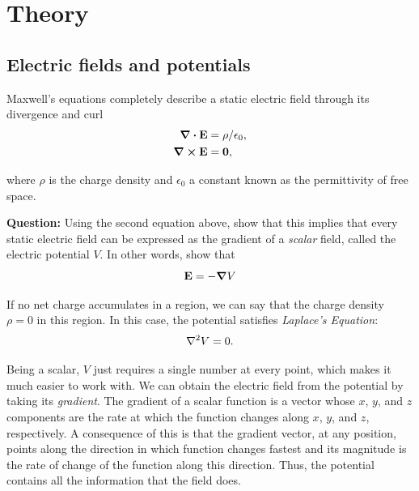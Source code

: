 \section*{Theory}

\subsection*{Electric fields and potentials}

Maxwell's equations completely describe a static electric field through its divergence and curl
\begin{equation}
    \begin{aligned}
        \div{\vb{E}} &= \rho/\epsilon_0,\\
        \curl{\vb{E}}&= \vb{0},
    \end{aligned}
\end{equation}

where $\rho$ is the charge density and $\epsilon_0$ a constant known as the permittivity of free space.

\begin{question}
\textbf{Question:} Using the second equation above, show that this implies that every static electric field can be expressed as the gradient of a \textsl{scalar} field, called the electric potential $V$. In other words, show that 
\begin{equation}
    \vb{E} = - \gradient{V}
\end{equation}
\end{question}

If no net charge accumulates in a region, we can say that the charge density $\rho = 0$ in this region. In this case, the potential satisfies \textsl{Laplace's Equation}:
\begin{equation}
    \laplacian{V} = 0.
    \label{eqn:laplace}
\end{equation}

Being a scalar, $V$ just requires a single number at every point, which makes it much easier to work with. We can obtain the electric field from the potential by taking its \textsl{gradient}. The gradient of a scalar function is a vector whose $x$, $y$, and $z$ components are the rate at which the function changes along $x$, $y$, and $z$, respectively. A consequence of this is that the gradient vector, at any position, points along the direction in which function changes fastest and its magnitude is the rate of change of the function along this direction. Thus, the potential contains all the information that the field does.

